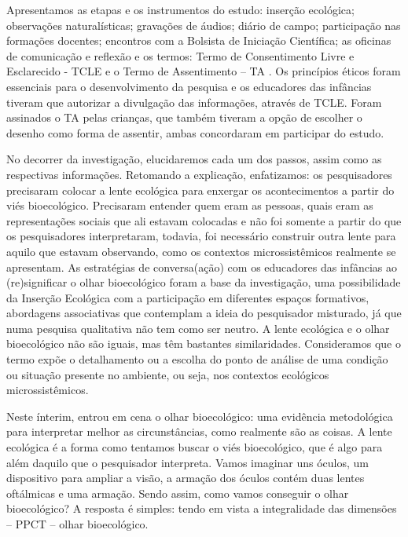 \documentclass{textolivre-html}
\begin{document}
Apresentamos as etapas e os instrumentos do estudo: inserção ecológica; observações naturalísticas; gravações de áudios; diário de campo; participação nas formações docentes; encontros com a Bolsista de Iniciação Científica; as oficinas de comunicação e reflexão e os termos: Termo de Consentimento Livre e Esclarecido - TCLE e o Termo de Assentimento -- TA \cite{Missio2018}. Os princípios éticos foram essenciais para o desenvolvimento da pesquisa e os educadores das infâncias tiveram que autorizar a divulgação das informações, através de TCLE. Foram assinados o TA pelas crianças, que também tiveram a opção de escolher o desenho como forma de assentir, ambas concordaram em participar do estudo.

No decorrer da investigação, elucidaremos cada um dos passos, assim como as respectivas informações. Retomando a explicação, enfatizamos: os pesquisadores precisaram colocar a lente ecológica para enxergar os acontecimentos a partir do viés bioecológico. Precisaram entender quem eram as pessoas, quais eram as representações sociais que ali estavam colocadas e não foi somente a partir do que os pesquisadores interpretaram, todavia, foi necessário construir outra lente para aquilo que estavam observando, como os contextos microssistêmicos realmente se apresentam. 
As estratégias de conversa(ação) com os educadores das infâncias ao (re)significar o olhar bioecológico foram a base da investigação, uma possibilidade da Inserção Ecológica \cite{piske2018c,koller2016,silveira2009} com a participação em diferentes espaços formativos, abordagens associativas que contemplam a ideia do pesquisador misturado, já que numa pesquisa qualitativa não tem como ser neutro. A lente ecológica e o olhar bioecológico não são iguais, mas têm bastantes similaridades. Consideramos que o termo expõe o detalhamento ou a escolha do ponto de análise de uma condição ou situação presente no ambiente, ou seja, nos contextos ecológicos microssistêmicos. 

Neste ínterim, entrou em cena o olhar bioecológico: uma evidência metodológica para interpretar melhor as circunstâncias, como realmente são as coisas. A lente ecológica é a forma como tentamos buscar o viés bioecológico, que é algo para além daquilo que o pesquisador interpreta. Vamos imaginar uns óculos, um dispositivo para ampliar a visão, a armação dos óculos contém duas lentes oftálmicas e uma armação. Sendo assim, como vamos conseguir o olhar bioecológico? A resposta é simples: tendo em vista a integralidade das dimensões -- PPCT -- olhar bioecológico. 
\end{document}
